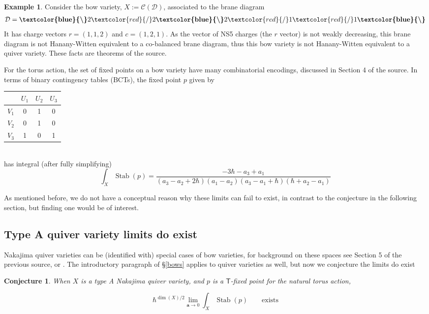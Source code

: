\documentclass[12 pt]{article}
\theoremstyle{plain}
\theoremstyle{plain}
\theoremstyle{plain}
\theoremstyle{plain}
\theoremstyle{plain}
\theoremstyle{plain}
\theoremstyle{plain}
\theoremstyle{plain}
\theoremstyle{plain}
\newtheorem{conjecture}[theorem]{Conjecture}
\theoremstyle{plain}
\theoremstyle{remark}
\theoremstyle{remark}
\theoremstyle{definition}
\theoremstyle{definition}
\theoremstyle{definition}
\newtheorem{example}{Example}[section]
\theoremstyle{definition}
\theoremstyle{definition}
\theoremstyle{definition}
\DeclareMathOperator{\Stab}{Stab}
\newcommand{\NSf}{\textcolor{red}{/}}
\newcommand{\Df}{\textbf{\textcolor{blue}{\textbackslash}}}
\newcommand{\bT}{\mathsf{T}}
\begin{document}
\begin{example}
Consider the bow variety, $X:=\mathcal C(\mathcal D)$, associated to the brane diagram
\begin{gather*}
\mathcal D= \Df 2 \NSf 2 \Df 2 \NSf 1 \NSf 1 \Df
\end{gather*}
It has charge vectors $r=(1,1,2)$ and $c=(1,2,1)$. As the vector of NS5 charges (the $r$ vector) is not weakly decreasing, this brane diagram is not Hanany-Witten equivalent to a co-balanced brane diagram, thus this bow variety is not Hanany-Witten equivalent to a quiver variety. These facts are theorems of the source.

For the torus action, the set of fixed points on a bow variety have many combinatorial encodings, discussed in Section 4 of the source. In terms of binary contingency tables (BCTs), the fixed point $p$ given by
    \begin{table}[h!]
        \centering
        \begin{tabular}{c|c|c|c|}
             &$U_1$ & $U_2$ & $U_3$\\
             \hline
             $V_1$&0&1  &0 \\\hline
             $V_2$&0& 1 &0 \\\hline
             $V_3$&1&0  &1 \\
             \hline
        \end{tabular}
    \end{table}
    \\
has integral (after fully simplifying)
\[
\int_{X}\Stab(p)=\frac{-3\hbar-a_3+a_1}{(a_3-a_2+2\hbar)(a_1-a_2)(a_3-a_1+\hbar)(\hbar+a_2-a_1)}
\]
\end{example}

As mentioned before, we do not have a conceptual reason why these limits can fail to exist, in contrast to the conjecture in the following section, but finding one would be of interest. 

\subsection{Type A quiver variety limits do exist}

Nakajima quiver varieties can be (identified with) special cases of bow varieties, for background on these spaces see Section 5 of the previous source, or \cite{NQV}. The introductory paragraph of \S\ref{bows} applies to quiver varieties as well, but now we conjecture the limits do exist 

\begin{conjecture}
When $X$ is a type A Nakajima quiver variety, and $p$ is a $\bT$-fixed point for the natural torus action,

\[
\hbar^{\dim(X)/2}\lim_{\mathbf{a}\to 0}\int_X\Stab(p) \quad \quad \mathrm{exists}
\]
\end{conjecture}
\end{document}
